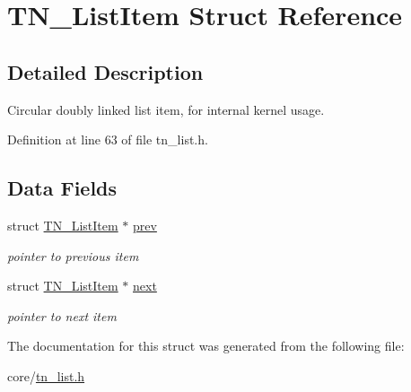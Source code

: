 \hypertarget{structTN__ListItem}{\section{T\+N\+\_\+\+List\+Item Struct Reference}
\label{structTN__ListItem}
}


\subsection{Detailed Description}
Circular doubly linked list item, for internal kernel usage. 

Definition at line 63 of file tn\+\_\+list.\+h.

\subsection*{Data Fields}
\begin{DoxyCompactItemize}
\item 
\hypertarget{structTN__ListItem_a0c53c087a1523596cd81cd25d1aae7d8}{struct \hyperlink{structTN__ListItem}{T\+N\+\_\+\+List\+Item} $\ast$ \hyperlink{structTN__ListItem_a0c53c087a1523596cd81cd25d1aae7d8}{prev}}\label{structTN__ListItem_a0c53c087a1523596cd81cd25d1aae7d8}

\begin{DoxyCompactList}\small\item\em pointer to previous item \end{DoxyCompactList}\item 
\hypertarget{structTN__ListItem_a66648d1a9069530836c3fd738b03ab96}{struct \hyperlink{structTN__ListItem}{T\+N\+\_\+\+List\+Item} $\ast$ \hyperlink{structTN__ListItem_a66648d1a9069530836c3fd738b03ab96}{next}}\label{structTN__ListItem_a66648d1a9069530836c3fd738b03ab96}

\begin{DoxyCompactList}\small\item\em pointer to next item \end{DoxyCompactList}\end{DoxyCompactItemize}


The documentation for this struct was generated from the following file\+:\begin{DoxyCompactItemize}
\item 
core/\hyperlink{tn__list_8h}{tn\+\_\+list.\+h}\end{DoxyCompactItemize}
